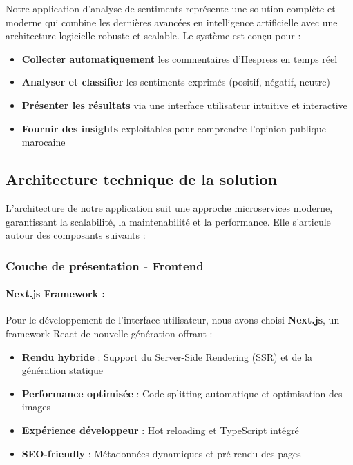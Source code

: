 Notre application d'analyse de sentiments représente une solution complète et moderne qui combine les dernières avancées en intelligence artificielle avec une architecture logicielle robuste et scalable. Le système est conçu pour :

\begin{itemize}
    \item \textbf{Collecter automatiquement} les commentaires d'Hespress en temps réel
    \item \textbf{Analyser et classifier} les sentiments exprimés (positif, négatif, neutre)
    \item \textbf{Présenter les résultats} via une interface utilisateur intuitive et interactive
    \item \textbf{Fournir des insights} exploitables pour comprendre l'opinion publique marocaine
\end{itemize}

\subsection{Architecture technique de la solution}

L'architecture de notre application suit une approche microservices moderne, garantissant la scalabilité, la maintenabilité et la performance. Elle s'articule autour des composants suivants :

\subsubsection{Couche de présentation - Frontend}

\paragraph{Next.js Framework :}
Pour le développement de l'interface utilisateur, nous avons choisi \textbf{Next.js}, un framework React de nouvelle génération offrant :

\begin{itemize}
    \item \textbf{Rendu hybride} : Support du Server-Side Rendering (SSR) et de la génération statique
    \item \textbf{Performance optimisée} : Code splitting automatique et optimisation des images
    \item \textbf{Expérience développeur} : Hot reloading et TypeScript intégré
    \item \textbf{SEO-friendly} : Métadonnées dynamiques et pré-rendu des pages
\end{itemize}

